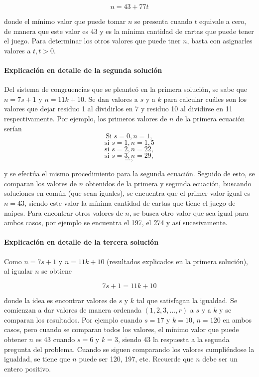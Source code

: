 \documentclass{article}
\begin{document}
	$$n=43+77t$$
	
	donde el mínimo valor que puede tomar $n$ se presenta cuando $t$ equivale a cero, de manera que este valor es 43 y es la mínima cantidad de cartas que puede tener el juego. Para determinar los otros valores que puede tner $n$, basta con asignarles valores a $t, t>0$. 
	
	\paragraph{Explicación en detalle de la segunda solución}
	Del sistema de congruencias que se pleanteó en la primera solución, se sabe que $n=7s+1$ y $n=11k+10$. Se dan valores a $s$ y a $k$ para calcular cuáles son los valores que dejar residuo 1 al dividirlos en 7 y residuo 10 al dividirse en 11 respectivamente. Por ejemplo, los primeros valores de $n$ de la primera ecuación serían
	$$\text{Si } s=0, n=1,$$
	$$\text{si } s=1, n=1,5$$
	$$\text{si } s=2, n=22,$$
	$$\text{si } s=3, n=29,$$
	$$...,$$
	
	y se efectúa el mismo procedimiento para la segunda ecuación. Seguido de esto, se comparan los valores de $n$ obtenidos de la primera y segunda ecuación, buscando soluciones en común (que sean iguales), se encuentra que el primer valor igual es $n=43$, siendo este valor la mínima cantidad de cartas que tiene el juego de naipes. Para encontrar otros valores de $n$, se busca otro valor que sea igual para ambos casos, por ejemplo se encuentra el 197, el 274 y así sucesivamente.
	
	\paragraph{Explicación en detalle de la tercera solución}
	Como $n=7s+1$ y $n=11k+10$ (resultados explicados en la primera solución), al igualar $n$ se obtiene 
	
	$$7s+1=11k+10$$
	
	donde la idea es encontrar valores de $s$ y $k$ tal que satisfagan la igualdad. Se comienzan a dar valores de manera ordenada $(1, 2, 3, ..., r)$ a $s$ y a $k$ y se comparan los resultados. Por ejemplo cuando $s=17$ y $k=10$, $n=120$ en ambos casos, pero cuando se comparan todos los valores, el mínimo valor que puede obtener $n$ es 43 cuando $s=6$ y $k=3$, siendo 43 la respuesta a la segunda pregunta del problema. Cuando se siguen comparando los valores cumpliéndose la igualdad, se tiene que $n$ puede ser 120, 197, etc. Recuerde que $n$ debe ser un entero positivo. 
	
\end{document}
